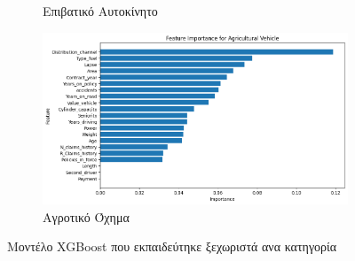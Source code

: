 \documentclass{llncs}
\begin{document}
\begin{figure}
\begin{subfigure}{0.45\linewidth}
       \caption{Επιβατικό Αυτοκίνητο}
       \label{fig:subxgb3}
        \end{subfigure}
         \begin{subfigure}{0.45\linewidth}
        \includegraphics[width=\linewidth]{images/Agricultural Vehicle_feature_importance_xgb.png}
        \caption{Αγροτικό Όχημα}
        \label{fig:subxgb4}
         \end{subfigure}
  \caption{Μοντέλο XGBoost που εκπαιδεύτηκε ξεχωριστά ανα κατηγορία}
  \label{fig:xgb_split_importance}
\end{figure}
\end{document}
